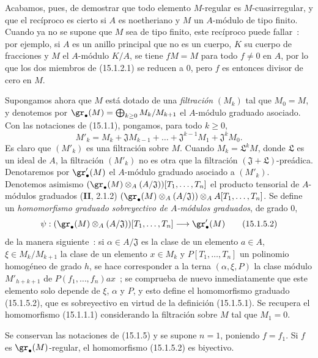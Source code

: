Acabamos, pues, de demostrar que todo elemento $M$-regular es
$M$-cuasirregular, y que el recíproco es cierto si $A$ es noetheriano y $M$
un $A$-módulo de tipo finito. Cuando ya no se supone que $M$ sea de tipo
finito, este recíproco puede fallar~: por ejemplo, si $A$ es un anillo
principal que no es un cuerpo, $K$ su cuerpo de fracciones y $M$ el
$A$-módulo $K/A$, se tiene $fM=M$ para todo $f\neq0$ en $A$, por lo que los
dos miembros de (15.1.2.1) se reducen a $0$, pero $f$ es entonces divisor de
cero en $M$.


\begin{env}[15.1.5]
\label{0.15.1.5-fr}

Supongamos ahora que $M$ está dotado de una \emph{filtración} $(M_k)$ tal que
$M_0=M$, y denotemos por
$\gr_\bullet(M)=\bigoplus_{k\geq0}M_k/M_{k+1}$ el $A$-módulo graduado asociado.
Con las notaciones de (15.1.1), pongamos, para todo $k\geq0$,
\[
  M'_k=M_k+\mathfrak{J}M_{k-1}+\ldots+
  \mathfrak{J}^{k-1}M_1+\mathfrak{J}^kM_0.
  \tag{15.1.5.1}\label{0.15.1.5.1-fr}
\]
Es claro que $(M'_k)$ es una filtración sobre $M$. Cuando
$M_k=\mathfrak{L}^kM$, donde $\mathfrak L$ es un ideal de $A$, la filtración
$(M'_k)$ no es otra que la filtración
$(\mathfrak{J}+\mathfrak{L})$-preádica. Denotaremos por
$\gr'_\bullet(M)$ el $A$-módulo graduado asociado a $(M'_k)$. Denotemos asimismo
$(\gr_\bullet(M)\otimes_A(A/\mathfrak{J}))[T_1,\ldots,T_n]$
el producto tensorial de $A$-módulos graduados (\textbf{II}, 2.1.2)
$(\gr_\bullet(M)\otimes_A(A/\mathfrak{J}))\otimes_A A[T_1,\ldots,T_n]$.
Se define un \emph{homomorfismo graduado sobreyectivo de $A$-módulos graduados},
de grado $0$,
\[
  \psi:(\gr_\bullet(M)\otimes_A(A/\mathfrak{J}))[T_1,\ldots,T_n]
  \longrightarrow\gr'_\bullet(M)
  \tag{15.1.5.2}\label{0.15.1.5.2-fr}
\]
de la manera siguiente~: si $\alpha\in A/\mathfrak{J}$ es la clase de un
elemento $a\in A$, $\xi\in M_k/M_{k+1}$ la clase de un elemento $x\in M_k$ y
$P[T_1,\ldots,T_n]$ un polinomio homogéneo de grado $h$, se hace corresponder
a la terna $(\alpha,\xi,P)$ la clase módulo $M'_{h+k+1}$ de
$P(f_1,\ldots,f_n)ax$~; se comprueba de nuevo inmediatamente que este elemento
solo depende de $\xi$, $\alpha$ y $P$, y esto define el homomorfismo graduado
(15.1.5.2), que es sobreyectivo en virtud de la definición (15.1.5.1). Se
recupera el homomorfismo (15.1.1.1) considerando la filtración sobre $M$ tal
que $M_1=0$.
\end{env}

\begin{lemma}[15.1.6]
\label{0.15.1.6-fr}
Se conservan las notaciones de (15.1.5) y se supone $n=1$, poniendo $f=f_1$.
Si $f$ es $\gr_\bullet(M)$-regular, el homomorfismo (15.1.5.2) es biyectivo.
\end{lemma}

